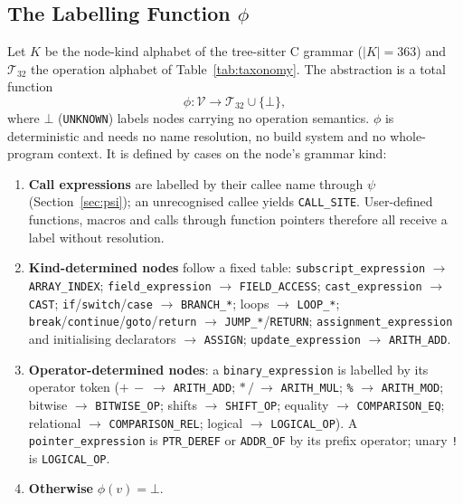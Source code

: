 \documentclass[pdflatex,sn-basic]{sn-jnl}
\theoremstyle{thmstyleone}%
\begin{document}
\subsection{The Labelling Function $\phi$}
\label{sec:phi}

Let $K$ be the node-kind alphabet of the tree-sitter C grammar ($|K| = 363$)
and $\mathcal{T}_{32}$ the operation alphabet of Table~\ref{tab:taxonomy}. The
abstraction is a total function
\begin{equation}
    \phi : \mathcal{V} \longrightarrow \mathcal{T}_{32} \cup \{\bot\},
\label{eq:phi}
\end{equation}
where $\bot$ (\texttt{UNKNOWN}) labels nodes carrying no operation semantics.
$\phi$ is deterministic and needs no name resolution, no build system and no
whole-program context. It is defined by cases on the node's grammar kind:

\begin{enumerate}
    \item \textbf{Call expressions} are labelled by their callee name through
          $\psi$ (Section~\ref{sec:psi}); an unrecognised callee yields
          \texttt{CALL\_SITE}. User-defined functions, macros and calls
          through function pointers therefore all receive a label without
          resolution.
    \item \textbf{Kind-determined nodes} follow a fixed table:
          \texttt{subscript\_expression} $\to$ \texttt{ARRAY\_INDEX};
          \texttt{field\_expression} $\to$ \texttt{FIELD\_ACCESS};
          \texttt{cast\_expression} $\to$ \texttt{CAST};
          \texttt{if}/\texttt{switch}/\texttt{case} $\to$ \texttt{BRANCH\_*};
          loops $\to$ \texttt{LOOP\_*};
          \texttt{break}/\texttt{continue}/\texttt{goto}/\texttt{return} $\to$
          \texttt{JUMP\_*}/\texttt{RETURN};
          \texttt{assignment\_expression} and initialising declarators $\to$
          \texttt{ASSIGN}; \texttt{update\_expression} $\to$
          \texttt{ARITH\_ADD}.
    \item \textbf{Operator-determined nodes}: a \texttt{binary\_expression} is
          labelled by its operator token ($+\,-\ \to$ \texttt{ARITH\_ADD};
          $*\,/\ \to$ \texttt{ARITH\_MUL}; \texttt{\%} $\to$
          \texttt{ARITH\_MOD}; bitwise $\to$ \texttt{BITWISE\_OP}; shifts
          $\to$ \texttt{SHIFT\_OP}; equality $\to$ \texttt{COMPARISON\_EQ};
          relational $\to$ \texttt{COMPARISON\_REL}; logical $\to$
          \texttt{LOGICAL\_OP}). A \texttt{pointer\_expression} is
          \texttt{PTR\_DEREF} or \texttt{ADDR\_OF} by its prefix operator;
          unary \texttt{!} is \texttt{LOGICAL\_OP}.
    \item \textbf{Otherwise} $\phi(v) = \bot$.
\end{enumerate}
\end{document}
